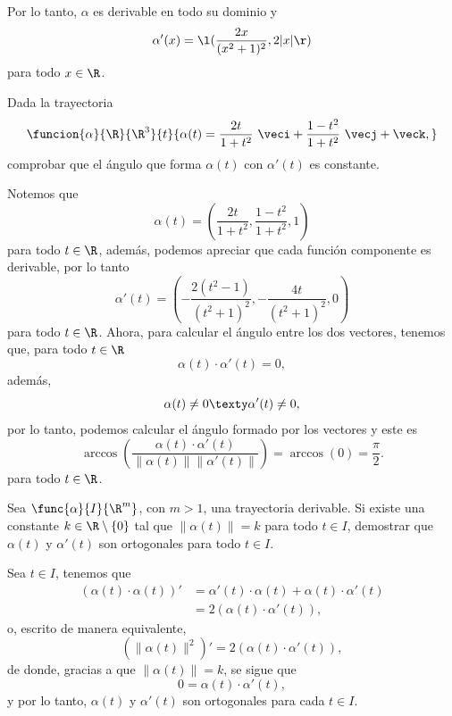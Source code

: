 \documentclass[a4,11pt]{aleph-examen}
\begin{document}
\begin{preguntas}
\begin{respuesta}
    Por lo tanto, $\alpha$ es derivable en todo su dominio y
    \[
        \alpha'(x)=\l(\dfrac{2x}{(x^2+1)^2},2|x|\r)
    \]
    para todo $x\in\R$.
\end{respuesta}


\item
    Dada la trayectoria
    \[
        \funcion{\alpha}{\R}{\R^3}{t}{\alpha(t)=
            \frac{2t}{1+t^2}\ \veci+\frac{1-t^2}{1+t^2}\ \vecj+\veck,
        }
    \]
    comprobar que el ángulo que forma $\alpha(t)$ con $\alpha'(t)$ es constante.

\begin{respuesta}
    Notemos que
    \[
        \alpha(t)=\left(\frac{2t}{1+t^2},\frac{1-t^2}{1+t^2},1\right)
    \]
    para todo $t\in\R$, además, podemos apreciar que cada función componente es derivable, por lo tanto
    \[
        \alpha'(t)=\left(-\frac{2 \left(t^2-1\right)}{\left(t^2+1\right)^2},-\frac{4 t}{\left(t^2+1\right)^2},0\right)
    \]
    para todo $t\in\R$. Ahora, para calcular el ángulo entre los dos vectores, tenemos que, para todo $t\in\R$
    \[
        \alpha(t)\cdot \alpha'(t) = 0,
    \]
    además,
    \[
        \alpha(t)\neq 0
        \texty
        \alpha'(t)\neq 0,
    \]
    por lo tanto, podemos calcular el ángulo formado por los vectores y este es
    \[
        \arccos\left( \frac{\alpha(t)\cdot \alpha'(t)}{\|\alpha(t)\|\|\alpha'(t)\|}\right)
        = \arccos(0) = \dfrac{\pi}{2}.
    \]
    para todo $t\in\R$.
\end{respuesta}

\item
    Sea $\func{\alpha}{I}{\R^m}$, con $m>1$, una trayectoria derivable. Si existe una constante $k\in\R\setminus\{0\}$ tal que $\| \alpha(t) \|=k$ para todo $t\in I$, demostrar que $\alpha(t)$ y $\alpha'(t)$ son ortogonales para todo $t\in I$.
    
\begin{respuesta}
    Sea $t\in I$, tenemos que
    \begin{align*}
        (\alpha(t) \cdot \alpha(t))'
            & = \alpha'(t) \cdot \alpha(t) + \alpha(t) \cdot \alpha'(t)\\
            & = 2(\alpha(t) \cdot \alpha'(t)),
    \end{align*}
    o, escrito de manera equivalente,
    \[
        (\|\alpha(t)\|^2)' = 2(\alpha(t) \cdot \alpha'(t)),
    \]
    de donde, gracias a que $\| \alpha(t) \|=k$, se sigue que
    \[
        0=\alpha(t) \cdot \alpha'(t),
    \]
    y por lo tanto, $\alpha(t)$ y $\alpha'(t)$ son ortogonales para cada $t\in I$.
\end{respuesta}


\end{preguntas}
\end{document}
